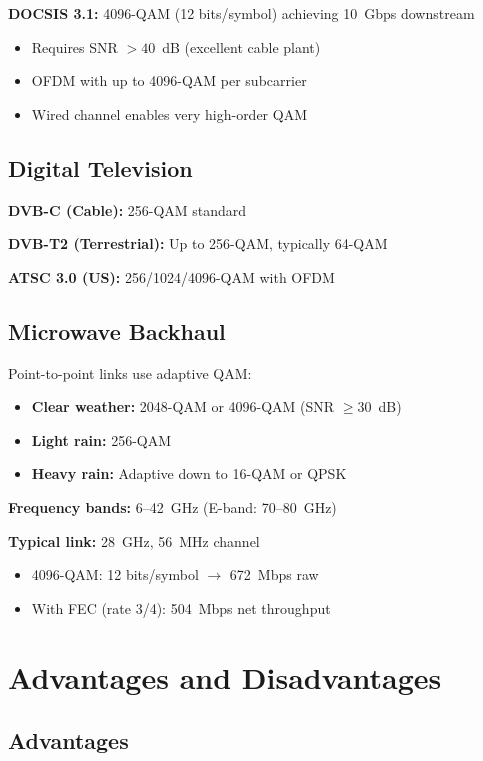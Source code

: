 \textbf{DOCSIS 3.1:} 4096-QAM (12 bits/symbol) achieving 10~Gbps downstream
\begin{itemize}
\item Requires SNR $> 40$~dB (excellent cable plant)
\item OFDM with up to 4096-QAM per subcarrier
\item Wired channel enables very high-order QAM
\end{itemize}

\subsection{Digital Television}

\textbf{DVB-C (Cable):} 256-QAM standard

\textbf{DVB-T2 (Terrestrial):} Up to 256-QAM, typically 64-QAM

\textbf{ATSC 3.0 (US):} 256/1024/4096-QAM with OFDM

\subsection{Microwave Backhaul}

Point-to-point links use adaptive QAM:
\begin{itemize}
\item \textbf{Clear weather:} 2048-QAM or 4096-QAM (SNR $\geq 30$~dB)
\item \textbf{Light rain:} 256-QAM
\item \textbf{Heavy rain:} Adaptive down to 16-QAM or QPSK
\end{itemize}

\textbf{Frequency bands:} 6--42~GHz (E-band: 70--80~GHz)

\textbf{Typical link:} 28~GHz, 56~MHz channel
\begin{itemize}
\item 4096-QAM: 12 bits/symbol $\rightarrow$ 672~Mbps raw
\item With FEC (rate 3/4): 504~Mbps net throughput
\end{itemize}

\section{Advantages and Disadvantages}

\subsection*{Advantages}

